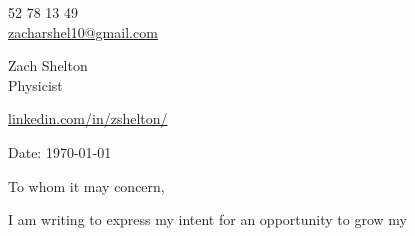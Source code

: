 \documentclass[11pt,a4]{article}
\begin{document}
\begin{center}
    \begin{minipage}[b]{0.24\textwidth}
            \large 52 78 13 49 \\
            \large \href{mailto:zshelton1997@gmail.com}{zacharshel10@gmail.com} 
    \end{minipage}%
    \begin{minipage}[b]{0.5\textwidth}
            \centering
            {\Huge Zach Shelton} \\ %
            \vspace{0.1cm}
            {\color{UI_blue} \Large{Physicist} }\\
        \end{minipage}

    \begin{minipage}[b]{0.24\textwidth}
            \flushright \large
            {\href{https://www.linkedin.com/in/zshelton/}{linkedin.com/in/zshelton/} } \\

    \end{minipage}   
    
\vspace{-0.15cm} 
{\color{UI_blue} \hrulefill}
\end{center}

\justify
\setlength{\parindent}{0pt}
\setlength{\parskip}{12pt}
\vspace{0.1cm}


Date: \today \par \vspace{-0.1cm}

To whom it may concern,

I am writing to express my intent for an opportunity to grow my 
\end{document}
